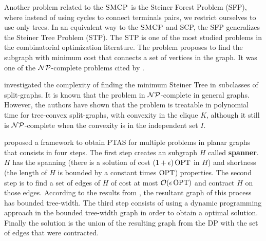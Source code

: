 Another problem related to the \(\textsc{SMCP}\) is the Steiner Forest Problem (SFP), where instead of using cycles to connect terminals pairs, we restrict ourselves to use only trees. In an equivalent way to the \(\textsc{SMCP}\) and SCP, the SFP generalizes the Steiner Tree Problem (STP). The STP is one of the most studied problems in the combinatorial optimization literature. The problem proposes to find the subgraph with minimum cost that connects a set of vertices in the graph. It was one of the \(\mathcal{NP}\)-complete problems cited by \cite{Karp1972}.


\cite{split-graphs} investigated the complexity of finding the minimum Steiner Tree in subclasses of split-graphs. It is known that the problem in \(\mathcal{NP}\)-complete in general graphs. However, the authors have shown that the problem is treatable in polynomial time for tree-convex split-graphs, with convexity in the clique \(K\), although it still is \(\mathcal{NP}\)-complete when the convexity is in the independent set \(I\).


\cite{KleinTSP} proposed a framework to obtain PTAS for multiple problems in planar graphs that consists in four steps. The first step creates an subgraph \(H\) called \textbf{spanner}. \(H\) has the spanning (there is a solution of cost \((1 + \epsilon) \operatorname{\textrm{OPT}}\) in \(H\)) and shortness (the length of \(H\) is bounded by a constant times \(\operatorname{\textrm{OPT}}\)) properties. The second step is to find a set of edges of \(H\) of cost at most \(\mathcal{O}(\epsilon \operatorname{\textrm{OPT}})\) and contract \(H\) on those edges. According to the results from \cite{Demaine2010}, the resultant graph of this process has bounded tree-width. The third step consists of using a dynamic programming approach in the bounded tree-width graph in order to obtain a optimal solution. Finally the solution is the union of the resulting graph from the DP with the set of edges that were contracted.

